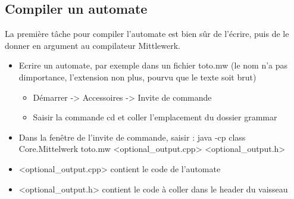 \documentclass[a4paper,11pt]{article}
\begin{document}
    \subsection{Compiler un automate}
        La première tâche pour compiler l'automate est bien sûr de l'écrire, puis de le donner en argument au compilateur Mittlewerk.\newline

        \begin{itemize}
            \item Ecrire un automate, par exemple dans un fichier toto.mw (le nom n'a pas dimportance, l'extension non plus, pourvu que le texte soit brut)
            \begin{itemize}
                            \item Démarrer -> Accessoires -> Invite de commande
                            \item Saisir la commande cd et coller l'emplacement du dossier grammar \newline
            \end{itemize}
            
            \item Dans la fenêtre de l'invite de commande, saisir : java -cp class Core.Mittelwerk toto.mw <optional\_output.cpp> <optional\_output.h>
            \item <optional\_output.cpp> contient le code de l'automate
            \item <optional\_output.h> contient le code à coller dans le header du vaisseau	
        \end{itemize}
\end{document}
